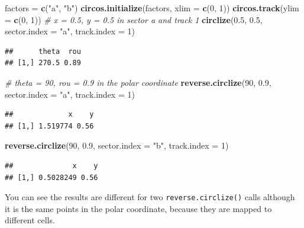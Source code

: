 \documentclass[]{book}
\newenvironment{Shaded}{\begin{snugshade}}{\end{snugshade}}
\newcommand{\KeywordTok}[1]{\textcolor[rgb]{0.13,0.29,0.53}{\textbf{#1}}}
\newcommand{\DataTypeTok}[1]{\textcolor[rgb]{0.13,0.29,0.53}{#1}}
\newcommand{\DecValTok}[1]{\textcolor[rgb]{0.00,0.00,0.81}{#1}}
\newcommand{\FloatTok}[1]{\textcolor[rgb]{0.00,0.00,0.81}{#1}}
\newcommand{\StringTok}[1]{\textcolor[rgb]{0.31,0.60,0.02}{#1}}
\newcommand{\CommentTok}[1]{\textcolor[rgb]{0.56,0.35,0.01}{\textit{#1}}}
\newcommand{\NormalTok}[1]{#1}
\begin{document}
\begin{Shaded}
\begin{Highlighting}[]
\NormalTok{factors =}\StringTok{ }\KeywordTok{c}\NormalTok{(}\StringTok{"a"}\NormalTok{, }\StringTok{"b"}\NormalTok{)}
\KeywordTok{circos.initialize}\NormalTok{(factors, }\DataTypeTok{xlim =} \KeywordTok{c}\NormalTok{(}\DecValTok{0}\NormalTok{, }\DecValTok{1}\NormalTok{))}
\KeywordTok{circos.track}\NormalTok{(}\DataTypeTok{ylim =} \KeywordTok{c}\NormalTok{(}\DecValTok{0}\NormalTok{, }\DecValTok{1}\NormalTok{))}
\CommentTok{# x = 0.5, y = 0.5 in sector a and track 1}
\KeywordTok{circlize}\NormalTok{(}\FloatTok{0.5}\NormalTok{, }\FloatTok{0.5}\NormalTok{, }\DataTypeTok{sector.index =} \StringTok{"a"}\NormalTok{, }\DataTypeTok{track.index =} \DecValTok{1}\NormalTok{)}
\end{Highlighting}
\end{Shaded}

\begin{verbatim}
##      theta  rou
## [1,] 270.5 0.89
\end{verbatim}

\begin{Shaded}
\begin{Highlighting}[]
\CommentTok{# theta = 90, rou = 0.9 in the polar coordinate}
\KeywordTok{reverse.circlize}\NormalTok{(}\DecValTok{90}\NormalTok{, }\FloatTok{0.9}\NormalTok{, }\DataTypeTok{sector.index =} \StringTok{"a"}\NormalTok{, }\DataTypeTok{track.index =} \DecValTok{1}\NormalTok{)}
\end{Highlighting}
\end{Shaded}

\begin{verbatim}
##             x    y
## [1,] 1.519774 0.56
\end{verbatim}

\begin{Shaded}
\begin{Highlighting}[]
\KeywordTok{reverse.circlize}\NormalTok{(}\DecValTok{90}\NormalTok{, }\FloatTok{0.9}\NormalTok{, }\DataTypeTok{sector.index =} \StringTok{"b"}\NormalTok{, }\DataTypeTok{track.index =} \DecValTok{1}\NormalTok{)}
\end{Highlighting}
\end{Shaded}

\begin{verbatim}
##              x    y
## [1,] 0.5028249 0.56
\end{verbatim}

You can see the results are different for two
\texttt{reverse.circlize()} calls although it is the same points in the
polar coordinate, because they are mapped to different cells.
\end{document}
